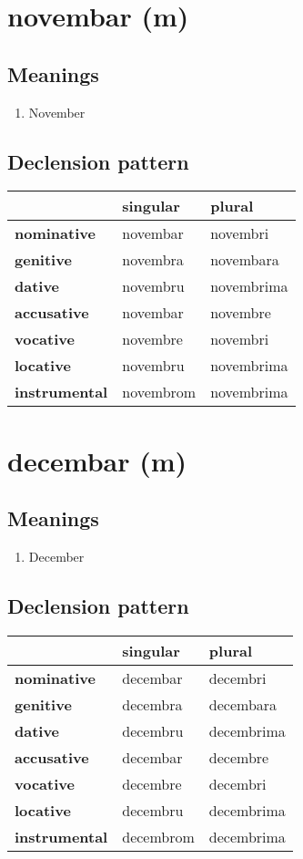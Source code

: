 \filbreak
\section{novembar (m)}
\subsection*{Meanings}
\begin{enumerate}
\item November
\end{enumerate}
\subsection*{Declension pattern}
\begin{tabularx}{\linewidth}{Xll}
\toprule
{} &   singular &      plural \\
\midrule
\textbf{nominative  } &   novembar &    novembri \\
\textbf{genitive    } &   novembra &   novembara \\
\textbf{dative      } &   novembru &  novembrima \\
\textbf{accusative  } &   novembar &    novembre \\
\textbf{vocative    } &   novembre &    novembri \\
\textbf{locative    } &   novembru &  novembrima \\
\textbf{instrumental} &  novembrom &  novembrima \\
\bottomrule
\end{tabularx}

\filbreak
\section{decembar (m)}
\subsection*{Meanings}
\begin{enumerate}
\item December
\end{enumerate}
\subsection*{Declension pattern}
\begin{tabularx}{\linewidth}{Xll}
\toprule
{} &   singular &      plural \\
\midrule
\textbf{nominative  } &   decembar &    decembri \\
\textbf{genitive    } &   decembra &   decembara \\
\textbf{dative      } &   decembru &  decembrima \\
\textbf{accusative  } &   decembar &    decembre \\
\textbf{vocative    } &   decembre &    decembri \\
\textbf{locative    } &   decembru &  decembrima \\
\textbf{instrumental} &  decembrom &  decembrima \\
\bottomrule
\end{tabularx}

